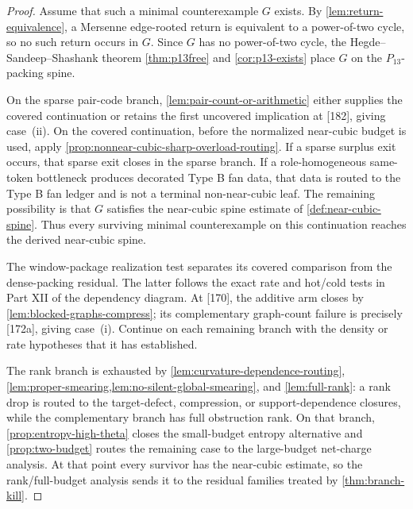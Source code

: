 \documentclass[11pt]{article}
\begin{document}
\begin{proof}
Assume that such a minimal counterexample
\(G\) exists.  By \cref{lem:return-equivalence}, a Mersenne edge-rooted return
is equivalent to a power-of-two cycle, so no such return occurs in \(G\).
Since \(G\) has no power-of-two cycle, the Hegde--Sandeep--Shashank theorem
\cref{thm:p13free} and \cref{cor:p13-exists} place \(G\) on the
\(P_{13}\)-packing spine.

On the sparse pair-code branch, \cref{lem:pair-count-or-arithmetic} either
supplies the covered continuation or retains the first uncovered implication
at [182], giving case~\textup{(ii)}.  On the covered continuation, before
the normalized near-cubic budget is used, apply
\cref{prop:nonnear-cubic-sharp-overload-routing}.  If a sparse
surplus exit occurs, that sparse exit closes in the sparse branch.  If a
role-homogeneous same-token bottleneck produces decorated Type B fan data, that
data is routed to the Type B fan ledger and is not a terminal non-near-cubic
leaf.  The remaining possibility is that \(G\) satisfies the near-cubic spine
estimate of \cref{def:near-cubic-spine}.  Thus every surviving minimal
counterexample on this continuation reaches the derived near-cubic spine.

The window-package realization test separates its covered comparison from
the dense-packing residual.  The latter follows the exact rate and hot/cold
tests in Part XII of the dependency diagram.  At [170], the additive arm
closes by \cref{lem:blocked-graphs-compress}; its complementary graph-count
failure is precisely [172a], giving case~\textup{(i)}.  Continue on each
remaining branch with the density or rate hypotheses that it has established.

The rank branch is exhausted by \cref{lem:curvature-dependence-routing},
\cref{lem:proper-smearing,lem:no-silent-global-smearing}, and
\cref{lem:full-rank}: a rank drop is routed to the target-defect,
compression, or support-dependence closures, while the complementary branch has
full obstruction rank.  On that branch, \cref{prop:entropy-high-theta} closes the
small-budget entropy alternative and \cref{prop:two-budget} routes the
remaining case to the large-budget net-charge analysis.  At that point every
survivor has the near-cubic estimate, so the rank/full-budget analysis sends it
to the residual families treated by \cref{thm:branch-kill}.


\end{proof}
\end{document}
